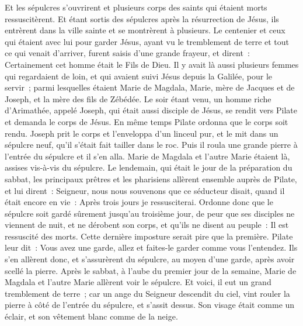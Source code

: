 \begin{multicols}{2}
Et les sépulcres s'ouvrirent et plusieurs corps des saints qui étaient morts ressuscitèrent.
Et étant sortis des sépulcres après la résurrection de Jésus, ils entrèrent dans la ville sainte et se montrèrent à plusieurs.
Le centenier et ceux qui étaient avec lui pour garder Jésus, ayant vu le tremblement de terre et tout ce qui venait d'arriver, furent saisis d'une grande frayeur, et dirent~: Certainement cet homme était le Fils de Dieu.
Il y avait là aussi plusieurs femmes qui regardaient de loin, et qui avaient suivi Jésus depuis la Galilée, pour le servir~;
parmi lesquelles étaient Marie de Magdala, Marie, mère de Jacques et de Joseph, et la mère des fils de Zébédée.
Le soir étant venu, un homme riche d'Arimathée, appelé Joseph, qui était aussi disciple de Jésus,
se rendit vers Pilate et demanda le corps de Jésus. En même temps Pilate ordonna que le corps soit rendu.
Joseph prit le corps et l'enveloppa d'un linceul pur,
et le mit dans un sépulcre neuf, qu'il s'était fait tailler dans le roc. Puis il roula une grande pierre à l'entrée du sépulcre et il s'en alla.
Marie de Magdala et l'autre Marie étaient là, assises vis-à-vis du sépulcre.
Le lendemain, qui était le jour de la préparation du sabbat, les principaux prêtres et les pharisiens allèrent ensemble auprès de Pilate,
et lui dirent~: Seigneur, nous nous souvenons que ce séducteur disait, quand il était encore en vie~: Après trois jours je ressusciterai.
Ordonne donc que le sépulcre soit gardé sûrement jusqu'au troisième jour, de peur que ses disciples ne viennent de nuit, et ne dérobent son corps, et qu'ils ne disent au peuple~: Il est ressuscité des morts. Cette dernière imposture serait pire que la première.
Pilate leur dit~: Vous avez une garde, allez et faites-le garder comme vous l'entendez.
Ils s'en allèrent donc, et s'assurèrent du sépulcre, au moyen d'une garde, après avoir scellé la pierre.
\VerseOne{}Après le sabbat, à l'aube du premier jour de la semaine, Marie de Magdala et l'autre Marie allèrent voir le sépulcre.
Et voici, il eut un grand tremblement de terre~; car un ange du Seigneur descendit du ciel, vint rouler la pierre à côté de l'entrée du sépulcre, et s'assit dessus.
Son visage était comme un éclair, et son vêtement blanc comme de la neige.

\end{multicols}
